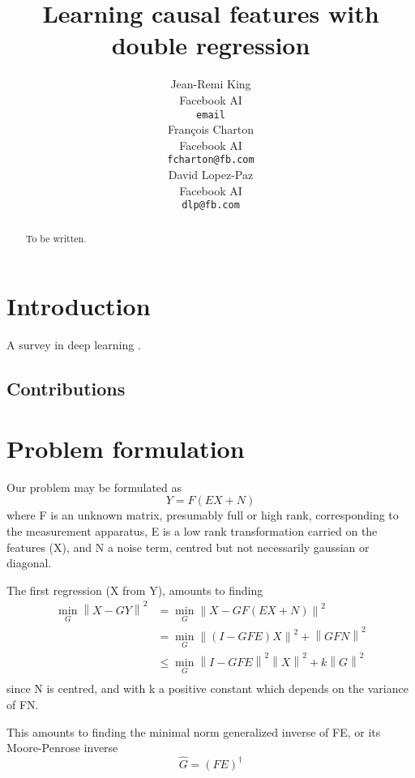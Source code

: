 \documentclass{article}
\title{Learning causal features with double regression}
\author{%
  Jean-Remi King\\
  Facebook AI\\
  \texttt{email} \\
  \And
  Fran\c{c}ois Charton\\
  Facebook AI\\
  \texttt{fcharton@fb.com}\\
  \And
  David Lopez-Paz\\
  Facebook AI\\
  \texttt{dlp@fb.com}
}
\begin{document}
\maketitle

\begin{abstract}
    To be written.
\end{abstract}

\section{Introduction}


A survey in deep learning \citep{deep_learning_nature}. 

\subsection{Contributions}

\section{Problem formulation}
Our problem may be formulated as
\begin{equation}
    Y = F(EX + N)
    \label{eq:model}
\end{equation}
where F is an unknown matrix, presumably full or high rank, corresponding to the measurement apparatus, E is a low rank transformation carried on the features (X), and N a noise term, centred but not necessarily gaussian or diagonal.

The first regression (X from Y), amounts to finding
\begin{equation}
\begin{aligned}
\min_G \left \| X-GY \right \|^2 &= \min_G \left \| X - GF(EX+N)\right\|^2 \\
&{}= \min_G \left \| (I-GFE)X\right\| ^2 + \left \| GFN\right \| ^2\\
&{}\leq \min_G \left \| I-GFE\right\| ^2 \left \| X\right\| ^2 + k\left \| G\right \| ^2\\ 
\end{aligned}
\end{equation}
since N is centred, and with k a positive constant which depends on the variance of FN.

This amounts to finding the minimal norm generalized inverse of FE, or its Moore-Penrose inverse
\begin{equation}
\hat  G= (FE)^{\dagger}
\end{equation}
\end{document}
